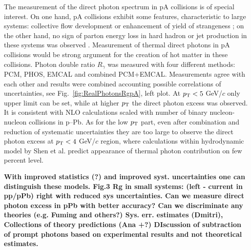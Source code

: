 \documentclass[../report.tex]{subfiles}
\begin{document}
The measurement of the direct photon spectrum in pA collisions is of special interest. On one hand, 
pA collisions exhibit some features, characteristic to large systems: collective flow development \cite{ABELEV:2013wsa} or enhancement of yield of strangeness \cite{Adam:2015vsf}; on the other hand, no sign of parton energy loss in hard hadron or jet production in these systems was observed \cite{Abelev:2014dsa}. 
Measurement of thermal direct photons in pA collisions would be strong argument for the creation of hot matter in these collisions.
Photon double ratio $R_\gamma$ was measured with four different methods: PCM, PHOS, EMCAL and combined PCM+EMCAL. Measurements agree with each other and results were combined accounting possible correlations of uncertainties, see Fig.\ \ref{fig:RealPhotonsRgpA}, left plot.  At $p_{\rm T}<5$ GeV/$c$  only upper limit can be set, while at higher $p_{\rm T}$ the direct photon excess was observed. It is consistent with NLO calculations scaled with number of binary nucleon-nucleon collisions in p--Pb. 
As for the low $p_{\rm T}$ part, even after combination and reduction of systematic uncertainties they are too large to observe the direct photon excess at $p_{\rm T}<4$ GeV/$c$ region, where calculations 
within hydrodynamic model by Shen et al. \cite{Shen:2016zpp} predict appearance of thermal photon contribution on few percent level. 
{\bf With improved statistics (?) and improved syst. uncertainties one can distinguish these models. Fig.3 Rg in small systems: (left - current in pp/pPb) right with reduced sys uncertainties. Can we measure direct photon excess in pPb with better accuracy? Can we discriminate any theories (e.g. Fuming and others?) Sys. err. estimates (Dmitri), Collections of theory predictions (Ana +?) DIscussion of subtraction of prompt photons based on experimental results and not theoretical estimates.

}
\end{document}
